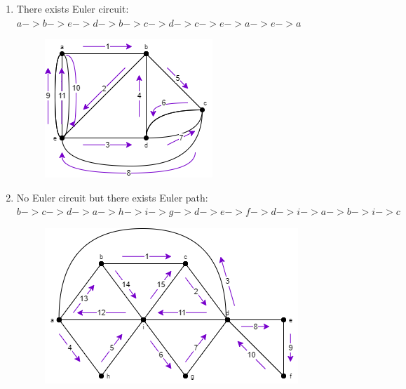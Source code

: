 \documentclass[a4paper]{article}
\begin{document}
\begin{enumerate}[label = \alph*)]
\begin{figure}[H]
	    \end{figure}
	    \item There exists Euler circuit: $a -> b -> e -> d -> b -> c -> d -> c -> e -> a -> e ->a$
	    \begin{figure}[H]
	        \centering
	        \includegraphics[width= 0.4 \textwidth]{tut912_10.png}
	    \end{figure}
	    \item No Euler circuit but there exists Euler path: $b -> c -> d -> a -> h -> i -> g -> d -> e -> f -> d -> i -> a -> b -> i -> c$
	    \begin{figure}[H]
	        \centering
	        \includegraphics[width= 0.5 \textwidth]{tut912_11.png}
	    \end{figure}
    \end{enumerate}
\end{document}
